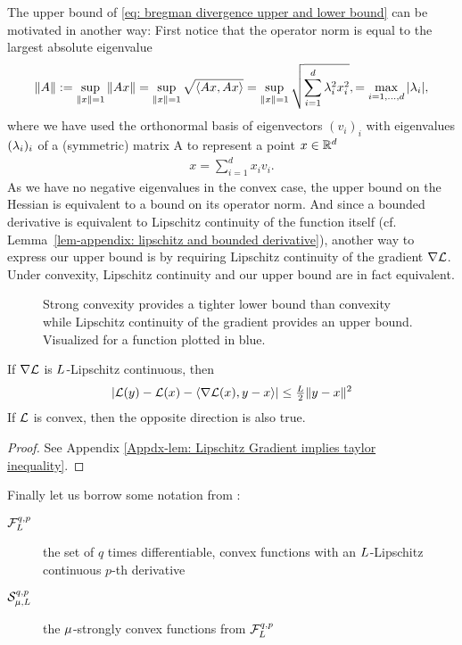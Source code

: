 The upper bound of \ref{eq: bregman divergence upper and lower bound} can be
motivated in another way: First notice that the operator norm is equal to the
largest absolute eigenvalue
\begin{align*}
	\|A\| := \sup_{\|x\| =1} \|Ax\|
	= \sup_{\|x\| =1} \sqrt{\langle Ax, Ax\rangle}
	= \sup_{\|x\| =1} \sqrt{\sum_{i=1}^\dimension \hesseEV_i^2 x_i^2},
	= \max_{i=1,\dots,\dimension} |\hesseEV_i|,
\end{align*}
where we have used the orthonormal basis of eigenvectors \((v_i)_i\) with
eigenvalues \((\hesseEV_i)_i\) of a (symmetric) matrix A to represent a point
\(x\in\reals^\dimension\)
\begin{align*}
	x = \sum_{i=1}^{d}x_i v_i.
\end{align*}
As we have no negative eigenvalues in the convex case, the upper bound on the
Hessian is equivalent to a bound on its operator norm. And since a
bounded derivative is equivalent to Lipschitz continuity of the function itself
(cf. Lemma~\ref{lem-appendix: lipschitz and bounded derivative}), another way
to express our upper bound is by requiring Lipschitz continuity of the gradient
\(\nabla \Loss\). Under convexity, Lipschitz continuity and our upper bound are
in fact equivalent.
%
\begin{figure}[h]
	\centering
	\def\svgwidth{1\textwidth}
	
	\caption{
		Strong convexity provides a tighter lower bound than convexity
		while Lipschitz continuity of the gradient provides an upper bound.
		Visualized for a function plotted in blue.
	}
	\label{fig: visualize strong convexity}
\end{figure}
%
\begin{lemma}
	\label{lem: Lipschitz Gradient implies taylor inequality}
	If \(\nabla \Loss\) is \(\ubound\)-Lipschitz continuous, then
	\begin{align*}
		| \Loss(y) - \Loss(x) - \langle \nabla \Loss(x), y-x\rangle |
		\le \tfrac{\ubound}2 \|y-x\|^2
	\end{align*}
	If \(\Loss\) is convex, then the opposite direction is also true.
\end{lemma}
\begin{proof}
	See Appendix \ref{Appdx-lem: Lipschitz Gradient implies taylor inequality}.
\end{proof}
%
\begin{definition}
	Finally let us borrow some notation from \citeauthor{nesterovLecturesConvexOptimization2018}:
	\begin{description}
		\item[{\(\lipGradientSet[q,p]{\ubound}\)}] the set of \(q\) times
		differentiable, convex functions with an \(\ubound\)-Lipschitz continuous
		\(p\)-th derivative
		\item[{\(\strongConvex[q,p]{\lbound}{\ubound}\)}] the \(\lbound\)-strongly convex
		functions from \(\lipGradientSet[q,p]{\ubound}\)
	\end{description}
\end{definition}

